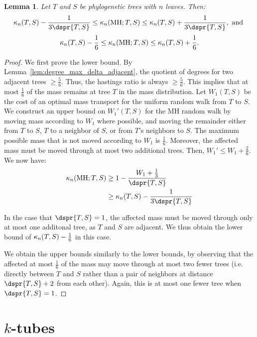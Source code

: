 \documentclass{amsart}
\newtheorem{lemma}[theorem]{Lemma}
\newcommand{\MH}{\operatorname{MH}}
\newcommand{\curvature}[2][]{%
    \ifthenelse{\equal{#1}{}}%
		{\kappa_n(#2)}%
		{\kappa_n(#1;#2)}%
}
\begin{document}
\begin{lemma}
	Let $T$ and $S$ be phylogenetic trees with $n$ leaves. Then:
	$$\curvature{T,S} - \frac{1}{3\dspr{T,S}}
	\le \curvature[\MH]{T,S}
	\le \curvature{T,S} + \frac{1}{3\dspr{T,S}}, \text{ and }$$
	$$\curvature{T,S} - \frac{1}{6}
	\le \curvature[\MH]{T,S}
	\le \curvature{T,S} + \frac{1}{6}.$$
\end{lemma}
\begin{proof}
	We first prove the lower bound.
	By Lemma~\ref{lem:degree_max_delta_adjacent}, the quotient of degrees for two adjacent trees $\ge \frac{5}{6}$.
	Thus, the hastings ratio is always $\ge \frac{5}{6}$.
	This implies that at most $\frac{1}{6}$ of the mass remains at tree $T$ in the mass distribution.
	Let $W_1(T,S)$ be the cost of an optimal mass transport for the uniform random walk from $T$ to $S$.
	We construct an upper bound on $W_1'(T,S)$ for the MH random walk by moving mass according to $W_1$ where possible, and moving the remainder either from $T$ to $S$, $T$ to a neighbor of $S$, or from $T$'s neighbors to $S$.
	The maximum possible mass that is not moved according to $W_1$ is $\frac{1}{6}$.
	Moreover, the affected mass must be moved through at most two additional trees.
	Then, $W_1' \le W_1 + \frac{2}{6}$.
	We now have:
	\begin{align*}
		\curvature[\MH]{T,S} & \ge 1 - \frac{W_1 + \frac{1}{3}}{\dspr{T,S}} \\
		& \ge \curvature{T,S} - \frac{1}{3\dspr{T,S}}
	\end{align*}

	In the case that $\dspr{T,S}=1$, the affected mass must be moved through only at most one additonal tree, as $T$ and $S$ are adjacent.
	We thus obtain the lower bound of $\curvature{T,S} - \frac{1}{6}$ in this case.

	We obtain the upper bounds similarly to the lower bounds, by observing that the affected at most $\frac{1}{6}$ of the mass may move through at most two fewer trees (i.e. directly between $T$ and $S$ rather than a pair of neighbors at distance $\dspr{T,S} + 2$ from each other).
	Again, this is at most one fewer tree when $\dspr{T,S}=1$.

\end{proof}











\section{$k$-tubes}
\end{document}
